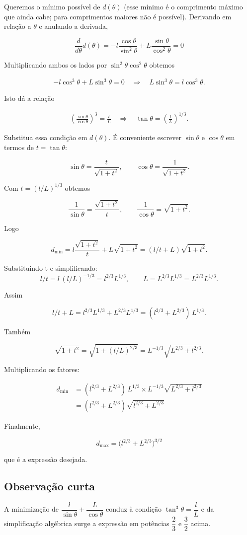 \documentclass[../resumo.tex]{subfiles}
\begin{document}
	Queremos o mínimo possível de $d(\theta)$ (esse mínimo é o comprimento máximo que ainda cabe; para comprimentos maiores
	não é possível). Derivando em relação a $\theta$ e anulando a derivada,
	
	\[ \frac{d}{d\theta}d(\theta) = -l\frac{\cos\theta}{\sin^2\theta}+L\frac{\sin\theta}{\cos^2\theta}=0 \]
	
	Multiplicando ambos os lados por \(\sin^2\theta\cos^2\theta\) obtemos
	
	\begin{align*}
		- l\cos^3\theta + L\sin^3\theta = 0
		\quad\Longrightarrow\quad
		L\sin^3\theta = l\cos^3\theta.
	\end{align*}
	
	Isto dá a relação

	\begin{align*}
		\left(\frac{\sin\theta}{\cos\theta}\right)^3 = \frac{l}{L}
		\quad\Longrightarrow\quad
		\tan\theta = \left(\frac{l}{L}\right)^{1/3}.
	\end{align*}

	Substitua essa condição em $d(\theta)$. É conveniente escrever \(\sin\theta\) e \(\cos\theta\) em termos de $t = \tan\theta$:

	\[
	\sin\theta=\frac{t}{\sqrt{1+t^2}},\qquad
	\cos\theta=\frac{1}{\sqrt{1+t^2}}.
	\]

	Com \(t=(l/L)^{1/3}\) obtemos

	\[
	\frac{1}{\sin\theta}=\frac{\sqrt{1+t^2}}{t},\qquad
	\frac{1}{\cos\theta}=\sqrt{1+t^2}.
	\]

	Logo

	\[
	d_{\min}=l\frac{\sqrt{1+t^2}}{t}+L\sqrt{1+t^2}=(l/t+L)\sqrt{1+t^2}.
	\]

	Substituindo t e simplificando:
	\[
	l/t = l\,(l/L)^{-1/3}=l^{2/3}L^{1/3},\qquad
	L = L^{2/3}L^{1/3}=L^{2/3}L^{1/3}.
	\]

	Assim

	\[
	l/t+L = l^{2/3}L^{1/3}+L^{2/3}L^{1/3}=(l^{2/3}+L^{2/3})\,L^{1/3}.
	\]

	Também

	\[
	\sqrt{1+t^2}=\sqrt{1+(l/L)^{2/3}}=L^{-1/3}\sqrt{L^{2/3}+l^{2/3}}.
	\]

	Multiplicando os fatores:

	\begin{align*}
		d_{\min} &= (l^{2/3}+L^{2/3})\, L^{1/3}\times L^{-1/3}\sqrt{L^{2/3}+l^{2/3}} \\
						 &= (l^{2/3}+L^{2/3})\sqrt{l^{2/3}+L^{2/3}}
	\end{align*}

	Finalmente,

	\[
		d_{\max}=\bigl(l^{2/3}+L^{2/3}\bigr)^{3/2}
	\]

	que é a expressão desejada.

	\subsection{Observação curta}

	A minimização de $\dfrac{l}{\sin\theta}+\dfrac{L}{\cos\theta}$ conduz à condição $\tan^3\theta=\dfrac{l}{L}$ e da simplificação algébrica
	surge a expressão em potências $\dfrac{2}{3}$ e $\dfrac{3}{2}$ acima.
\end{document}
